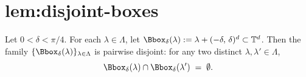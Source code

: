 \chapter{lem:disjoint-boxes}\label{chap:lem_disjoint_boxes}
\begin{lemma}
\label{lem:disjoint-boxes}
Let $0 < \delta < \pi/4$. For each $\lambda \in \Lambda$, let
$\Bbox_\delta(\lambda) := \lambda + (-\delta,\,\delta)^d \subset \mathbb{T}^d$.
Then the family $\{\Bbox_\delta(\lambda)\}_{\lambda \in \Lambda}$ is
pairwise disjoint: for any two distinct $\lambda, \lambda' \in \Lambda$,
\[
  \Bbox_\delta(\lambda) \cap \Bbox_\delta(\lambda') \;=\; \emptyset.
\]
\end{lemma}
